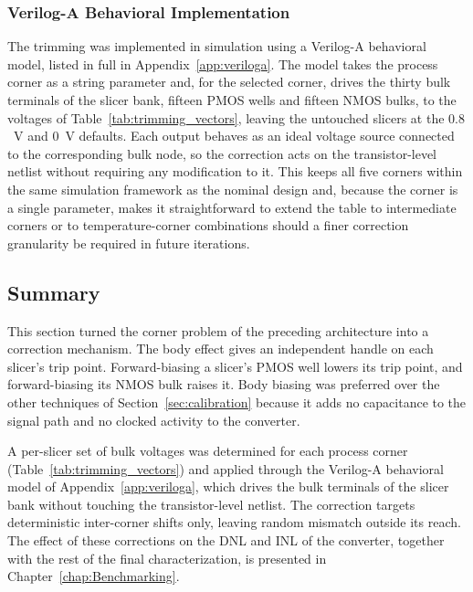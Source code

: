 \subsubsection{Verilog-A Behavioral Implementation}

The trimming was implemented in simulation using a Verilog-A behavioral
model, listed in full in Appendix~\ref{app:veriloga}. The model takes the
process corner as a string parameter and, for the selected corner, drives the
thirty bulk terminals of the slicer bank, fifteen PMOS wells and fifteen NMOS
bulks, to the voltages of Table~\ref{tab:trimming_vectors}, leaving the
untouched slicers at the $0.8$~V and $0$~V defaults. Each output behaves as an
ideal voltage source connected to the corresponding bulk node, so the
correction acts on the transistor-level netlist without requiring any
modification to it. This keeps all five corners within the same simulation
framework as the nominal design and, because the corner is a single parameter,
makes it straightforward to extend the table to intermediate corners or to
temperature-corner combinations should a finer correction granularity be
required in future iterations.

\subsection{Summary}

This section turned the corner problem of the preceding architecture into a correction mechanism. The body effect gives an independent handle on each slicer's trip point. Forward-biasing a slicer's PMOS well lowers its trip point, and forward-biasing its NMOS bulk raises it. Body biasing was preferred over the other techniques of Section~\ref{sec:calibration} because it adds no capacitance to the signal path and no clocked activity to the converter. 

A per-slicer set of bulk voltages was determined for each process corner (Table~\ref{tab:trimming_vectors}) and applied through the Verilog-A behavioral model of Appendix~\ref{app:veriloga}, which drives the bulk terminals of the slicer bank without touching the transistor-level netlist. The correction targets deterministic inter-corner shifts only, leaving random mismatch outside its reach. The effect of these corrections on the DNL and INL of the converter, together with the rest of the final characterization, is presented in Chapter~\ref{chap:Benchmarking}.
